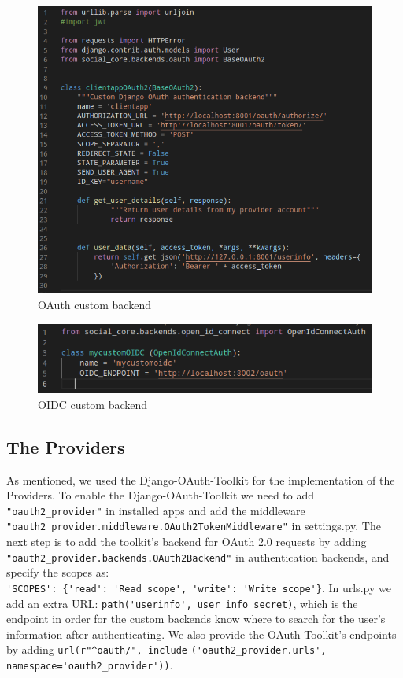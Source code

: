 \begin{figure}[htb]
	\centering
	\includegraphics[scale=0.5]{figures/clientapp.png}
	\caption{OAuth custom backend}
\end{figure}


\begin{figure}[htb]
	\centering
	\includegraphics[scale=0.6]{figures/customOIDC.png}
	\caption{OIDC custom backend}
\end{figure}




\subsection{The Providers}

As mentioned, we used the Django-OAuth-Toolkit for the implementation of the Providers. To enable the Django-OAuth-Toolkit we need to add \verb|"oauth2_provider"| in installed apps and add the middleware \verb|"oauth2_provider.middleware.OAuth2TokenMiddleware"| in settings.py. The next step is to add the toolkit's backend for OAuth 2.0 requests by adding \verb|"oauth2_provider.backends.OAuth2Backend"| in authentication backends, and specify the scopes as: \\ \verb|'SCOPES': {'read': 'Read scope', 'write': 'Write scope'}|.
In urls.py we add an extra URL: \verb|path('userinfo', user_info_secret)|, which is the endpoint in order for the custom backends know where to search for the user's information after authenticating. We also provide the OAuth Toolkit's endpoints by adding \verb|url(r"^oauth/", include| \verb|('oauth2_provider.urls', namespace='oauth2_provider'))|.


